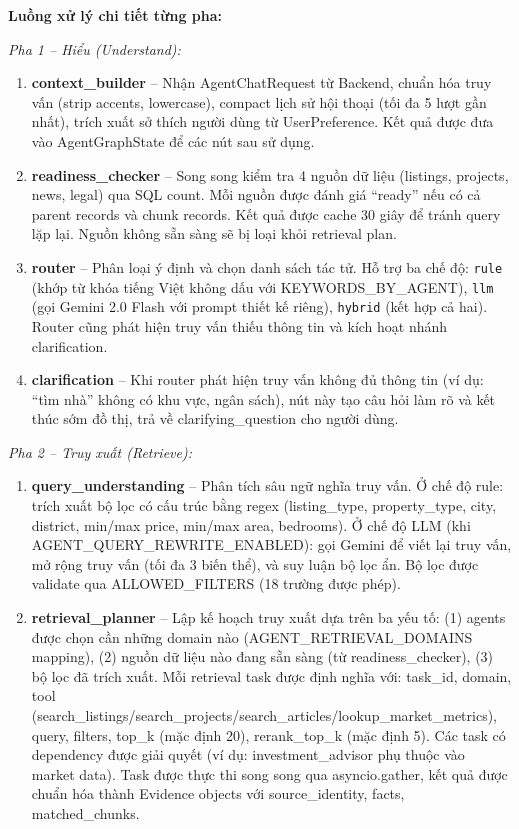\newpage

\textbf{Luồng xử lý chi tiết từng pha:}

\textit{Pha 1 -- Hiểu (Understand):}

\begin{enumerate}[leftmargin=*]
    \item \textbf{context\_builder} -- Nhận AgentChatRequest từ Backend, chuẩn hóa truy vấn (strip accents, lowercase), compact lịch sử hội thoại (tối đa 5 lượt gần nhất), trích xuất sở thích người dùng từ UserPreference. Kết quả được đưa vào AgentGraphState để các nút sau sử dụng.

    \item \textbf{readiness\_checker} -- Song song kiểm tra 4 nguồn dữ liệu (listings, projects, news, legal) qua SQL count. Mỗi nguồn được đánh giá ``ready'' nếu có cả parent records và chunk records. Kết quả được cache 30 giây để tránh query lặp lại. Nguồn không sẵn sàng sẽ bị loại khỏi retrieval plan.

    \item \textbf{router} -- Phân loại ý định và chọn danh sách tác tử. Hỗ trợ ba chế độ: \texttt{rule} (khớp từ khóa tiếng Việt không dấu với KEYWORDS\_BY\_AGENT), \texttt{llm} (gọi Gemini 2.0 Flash với prompt thiết kế riêng), \texttt{hybrid} (kết hợp cả hai). Router cũng phát hiện truy vấn thiếu thông tin và kích hoạt nhánh clarification.

    \item \textbf{clarification} -- Khi router phát hiện truy vấn không đủ thông tin (ví dụ: ``tìm nhà'' không có khu vực, ngân sách), nút này tạo câu hỏi làm rõ và kết thúc sớm đồ thị, trả về clarifying\_question cho người dùng.
\end{enumerate}

\textit{Pha 2 -- Truy xuất (Retrieve):}

\begin{enumerate}[leftmargin=4em]
    \item[5.] \textbf{query\_understanding} -- Phân tích sâu ngữ nghĩa truy vấn. Ở chế độ rule: trích xuất bộ lọc có cấu trúc bằng regex (listing\_type, property\_type, city, district, min/max price, min/max area, bedrooms). Ở chế độ LLM (khi AGENT\_QUERY\_REWRITE\_ENABLED): gọi Gemini để viết lại truy vấn, mở rộng truy vấn (tối đa 3 biến thể), và suy luận bộ lọc ẩn. Bộ lọc được validate qua ALLOWED\_FILTERS (18 trường được phép).

    \item[6.] \textbf{retrieval\_planner} -- Lập kế hoạch truy xuất dựa trên ba yếu tố: (1) agents được chọn cần những domain nào (AGENT\_RETRIEVAL\_DOMAINS mapping), (2) nguồn dữ liệu nào đang sẵn sàng (từ readiness\_checker), (3) bộ lọc đã trích xuất. Mỗi retrieval task được định nghĩa với: task\_id, domain, tool (search\_listings/search\_projects/search\_articles/lookup\_market\_metrics), query, filters, top\_k (mặc định 20), rerank\_top\_k (mặc định 5). Các task có dependency được giải quyết (ví dụ: investment\_advisor phụ thuộc vào market data). Task được thực thi song song qua asyncio.gather, kết quả được chuẩn hóa thành Evidence objects với source\_identity, facts, matched\_chunks.
\end{enumerate}

